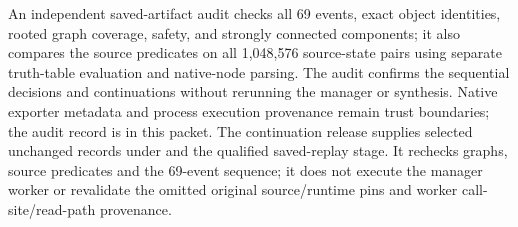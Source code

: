 An independent saved-artifact audit checks all 69 events, exact object
identities, rooted graph coverage, safety, and strongly connected components;
it also compares the source predicates on all 1,048,576 source-state pairs
using separate truth-table evaluation and native-node parsing.
The audit confirms the sequential decisions and continuations without
rerunning the manager or synthesis. Native exporter metadata and process
execution provenance remain trust boundaries; the audit record is
 in this packet.
The continuation release supplies selected unchanged records
under  and the qualified  saved-replay
stage. It rechecks graphs, source predicates and the 69-event sequence;
it does not execute the manager worker or revalidate the omitted original
source/runtime pins and worker call-site/read-path provenance.
